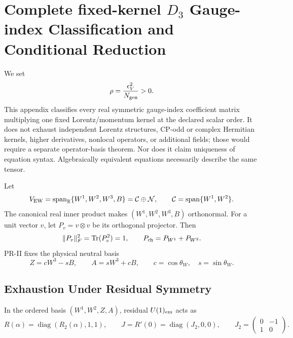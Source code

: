 \section{Complete fixed-kernel \texorpdfstring{$D_3$}{D3} Gauge-index Classification and Conditional Reduction}
\label{app:d3-coefficient-rigidity}

We set
\begin{equation}
 \rho=\frac{\epsilon_V^2}{N_{\rm gen}}>0.
 \label{eq:pr35-d3-rho}
\end{equation}
This appendix classifies every real symmetric gauge-index coefficient matrix multiplying one fixed Lorentz/momentum kernel at the declared scalar order.  It
does not exhaust independent Lorentz structures, CP-odd or complex Hermitian
kernels, higher derivatives, nonlocal operators, or additional fields; those
would require a separate operator-basis theorem.  Nor does it claim uniqueness
of equation syntax. Algebraically equivalent equations necessarily describe
the same tensor.

Let
\begin{equation}
 V_{\rm EW}=\operatorname{span}_{\mathbb R}
 \{W^1,W^2,W^3,B\}=\mathcal C\oplus\mathcal N,
 \qquad \mathcal C=\operatorname{span}\{W^1,W^2\}.
\end{equation}
The canonical real inner product makes $(W^1,W^2,W^3,B)$ orthonormal.  For a
unit vector $v$, let $P_v=v\otimes v$ be its orthogonal projector.  Then
\begin{equation}
 \|P_v\|_F^2=\operatorname{Tr}(P_v^2)=1,
 \qquad P_{\rm ch}=P_{W^1}+P_{W^2}.
 \label{eq:pr35-d3-projector-normalization}
\end{equation}
PR-II fixes the physical neutral basis \cite{PRII}
\begin{equation}
 Z=cW^3-sB,\qquad A=sW^3+cB,
 \qquad c=\cos\theta_W,\quad s=\sin\theta_W.
 \label{eq:pr35-d3-neutral-basis}
\end{equation}

\subsection{Exhaustion Under Residual Symmetry}

In the ordered basis $(W^1,W^2,Z,A)$, residual $U(1)_{\rm em}$ acts as
\begin{equation}
 R(\alpha)=\operatorname{diag}(R_2(\alpha),1,1),\qquad
 J=R'(0)=\operatorname{diag}(J_2,0,0),\qquad
 J_2=\begin{pmatrix}0&-1\\1&0\end{pmatrix}.
\end{equation}

